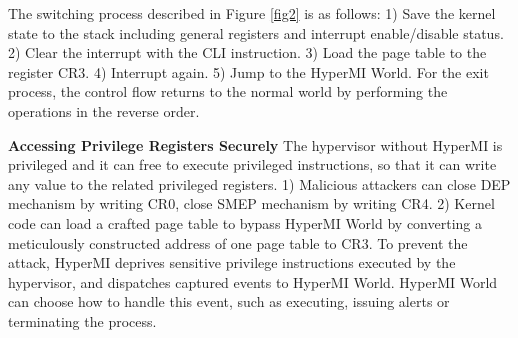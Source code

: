 \documentclass[conference]{IEEEtran}
\begin{document}
The switching process described in Figure \ref{fig2} is as follows: 1) Save the kernel state to the stack including general registers and interrupt enable/disable status. 2) Clear the interrupt with the CLI instruction. 3) Load the page table to the register CR3. 4) Interrupt again. 5) Jump to the HyperMI World. For the exit process, the control flow returns to the normal world by performing the operations in the reverse order.

\textbf{Accessing Privilege Registers Securely}
The hypervisor without HyperMI is privileged and it can free to execute privileged instructions, so that it can write any value to the related privileged registers. 1) Malicious attackers can close DEP mechanism by writing CR0, close SMEP mechanism by writing CR4. 2) Kernel code can load a crafted page table to bypass HyperMI World by converting a meticulously constructed address of one page table to CR3.
To prevent the attack, HyperMI deprives sensitive privilege instructions executed by the hypervisor, and dispatches captured events to HyperMI World. HyperMI World can choose how to handle this event, such as executing, issuing alerts or terminating the process. 
\end{document}
